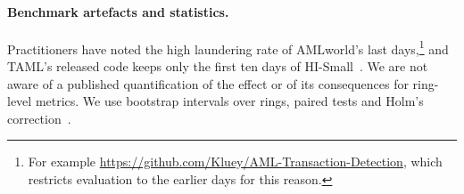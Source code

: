 \paragraph{Benchmark artefacts and statistics.}
Practitioners have noted the high laundering rate of AMLworld's last days,\footnote{For example
\url{https://github.com/Kluey/AML-Transaction-Detection}, which restricts evaluation to the
earlier days for this reason.} and TAML's released code keeps only the first ten days of
HI-Small~\citep{rico2026}. We are not aware of a published quantification of the effect or of
its consequences for ring-level metrics. We use bootstrap intervals over rings, paired tests and
Holm's correction~\citep{holm1979}.
